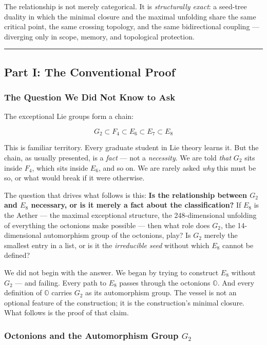 \documentclass[12pt,a4paper]{article}
\begin{document}
The relationship is not merely categorical. It is \emph{structurally exact}: a seed-tree duality in which the minimal closure and the maximal unfolding share the same critical point, the same crossing topology, and the same bidirectional coupling --- diverging only in scope, memory, and topological protection.

\begin{center}
\rule{0.5\textwidth}{0.4pt}
\end{center}

\subsection{Part I: The Conventional Proof}

\subsubsection{The Question We Did Not Know to Ask}

The exceptional Lie groups form a chain:

\[G_2 \subset F_4 \subset E_6 \subset E_7 \subset E_8\]

This is familiar territory. Every graduate student in Lie theory learns it. But the chain, as usually presented, is a \emph{fact} --- not a \emph{necessity}. We are told \emph{that} $G_2$ sits inside $F_4$, which sits inside $E_6$, and so on. We are rarely asked \emph{why} this must be so, or what would break if it were otherwise.

The question that drives what follows is this: \textbf{Is the relationship between $G_2$ and $E_8$ necessary, or is it merely a fact about the classification?} If $E_8$ is the Aether --- the maximal exceptional structure, the 248-dimensional unfolding of everything the octonions make possible --- then what role does $G_2$, the 14-dimensional automorphism group of the octonions, play? Is $G_2$ merely the smallest entry in a list, or is it the \emph{irreducible seed} without which $E_8$ cannot be defined?

We did not begin with the answer. We began by trying to construct $E_8$ without $G_2$ --- and failing. Every path to $E_8$ passes through the octonions $\mathbb{O}$. And every definition of $\mathbb{O}$ carries $G_2$ as its automorphism group. The vessel is not an optional feature of the construction; it is the construction's minimal closure. What follows is the proof of that claim.

\subsubsection{Octonions and the Automorphism Group $G_2$}
\end{document}
